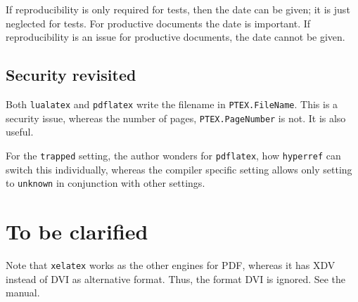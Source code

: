 \documentclass[a4paper]{article}%
\newcommand{\pdflatex}{\texttt{pdflatex}}
\newcommand{\lualatex}{\texttt{lualatex}}
\newcommand{\xelatex}{\texttt{xelatex}}
\begin{document}
If reproducibility is only required for tests, 
then the date can be given; it is just neglected for tests. 
For productive documents the date is important. 
If reproducibility is an issue for productive documents, the date cannot be given. 

\subsection{Security revisited}\label{subsec:security2}

Both \lualatex{} and \pdflatex{} write the filename in \texttt{PTEX.FileName}. 
This is a security issue, 
whereas the number of pages, \texttt{PTEX.PageNumber} is not. 
It is also useful. 

For the \texttt{trapped} setting, the author wonders for \pdflatex, 
how \texttt{hyperref} can switch this individually, whereas the compiler specific setting 
allows only setting to \texttt{unknown} 
in conjunction with other settings. 


\section{To be clarified}\label{sec:TBC}

Note that \xelatex{} works as the other engines for PDF, 
whereas it has XDV instead of DVI as alternative format. 
Thus, the format DVI is ignored. 
See the manual. 



{}%
\end{document}
